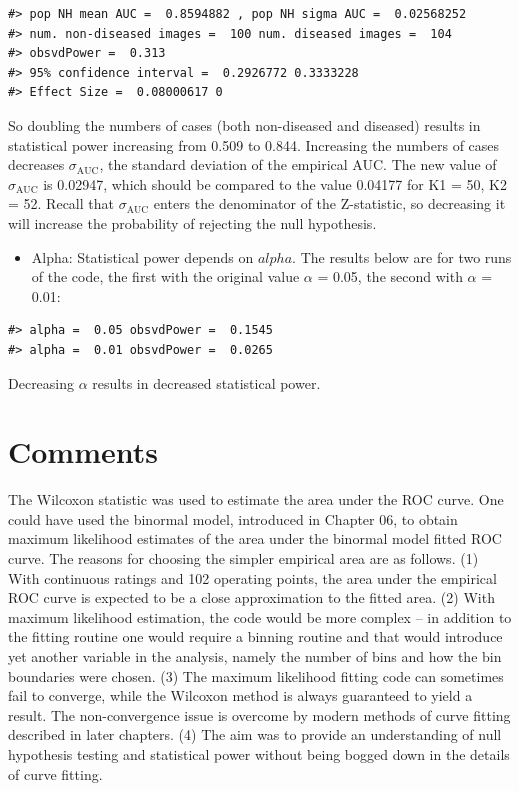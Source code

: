 \documentclass[
]{book}
\providecommand{\tightlist}{%
  \setlength{\itemsep}{0pt}\setlength{\parskip}{0pt}}
\begin{document}
\begin{verbatim}
#> pop NH mean AUC =  0.8594882 , pop NH sigma AUC =  0.02568252
#> num. non-diseased images =  100 num. diseased images =  104
#> obsvdPower =  0.313
#> 95% confidence interval =  0.2926772 0.3333228
#> Effect Size =  0.08000617 0
\end{verbatim}

So doubling the numbers of cases (both non-diseased and diseased) results in statistical power increasing from 0.509 to 0.844. Increasing the numbers of cases decreases \(\sigma_{\text{AUC}}\), the standard deviation of the empirical AUC. The new value of \(\sigma_{\text{AUC}}\) is 0.02947, which should be compared to the value 0.04177 for K1 = 50, K2 = 52. Recall that \(\sigma_{\text{AUC}}\) enters the denominator of the Z-statistic, so decreasing it will increase the probability of rejecting the null hypothesis.

\begin{itemize}
\tightlist
\item
  Alpha: Statistical power depends on \(alpha\). The results below are for two runs of the code, the first with the original value \(\alpha\) = 0.05, the second with \(\alpha\) = 0.01:
\end{itemize}

\begin{verbatim}
#> alpha =  0.05 obsvdPower =  0.1545 
#> alpha =  0.01 obsvdPower =  0.0265
\end{verbatim}

Decreasing \(\alpha\) results in decreased statistical power.

\hypertarget{HypothesisTestingComments}{%
\section{Comments}\label{HypothesisTestingComments}}

The Wilcoxon statistic was used to estimate the area under the ROC curve. One could have used the binormal model, introduced in Chapter 06, to obtain maximum likelihood estimates of the area under the binormal model fitted ROC curve. The reasons for choosing the simpler empirical area are as follows. (1) With continuous ratings and 102 operating points, the area under the empirical ROC curve is expected to be a close approximation to the fitted area. (2) With maximum likelihood estimation, the code would be more complex -- in addition to the fitting routine one would require a binning routine and that would introduce yet another variable in the analysis, namely the number of bins and how the bin boundaries were chosen. (3) The maximum likelihood fitting code can sometimes fail to converge, while the Wilcoxon method is always guaranteed to yield a result. The non-convergence issue is overcome by modern methods of curve fitting described in later chapters. (4) The aim was to provide an understanding of null hypothesis testing and statistical power without being bogged down in the details of curve fitting.
\end{document}
